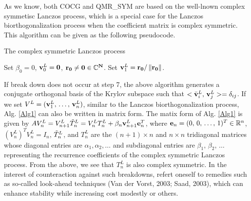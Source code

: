 \documentclass{article}
\begin{document}
As we know, both COCG and QMR\_SYM are based on the well-lnown complex symmetisc Lanczos process, which is a special case for the Lanczos biorthogonalization process when the coefficient matrix is complex symmetric. This algorithm can be given as the following pseudocode.
\begin{algorithm}
\caption{The complex symmetric Lanczos process}
\begin{algorithmic}[1]
\label{Alg1}
\State Set $\beta_0=0$, ${\bf{v}}^L_{0} = \bf{0}$, $\bf{r}_0 \neq \bf{0} \in \mathbb{C}^{N}$. 
\State Set ${\bf{v}}^{L}_{1} = \bf{r}_0 / \left\| \bf{r}_0 \right\|$.
\EndFor
\end{algorithmic}
\end{algorithm}
If break down does not occur at step 7, the above algorithm generates a conjugate orthogonal basis of the Krylov subspace such that $<{\bar{\bf{v}}}^L_{i}, \, {\bf{v}}^L_{j}> = \delta_{ij}$. If we set $V^L = ({\bf{v}}^L_1 , \, \dots ,\, {\bf{v}}^L_n)$, similar to the Lanczos biorthogonalization process, Alg. \ref{Alg1} can also be written in matrix form. The matix form of Alg. \ref{Alg1} is given by $A V^L_n = V^L_{n+1} \Tilde{T}^L_{n} = V^L_n T^L_n + \beta_n {\bf{v}}^L_{n+1}{\bf{e}}^T_n$, where ${\bf{e}}_n = (0, \, 0,\, \dots ,\, 1)^T \in \mathbb{R}^n$, $(V^L_n )^T V^L_n = I_n$, $\Tilde{T}^L_n$, and $T^L_n$ are the $(n+1) \times n$ and $n\times n$ tridiagonal matrices whose diagonal entries are $\alpha_1 , \alpha_2, \dots $ and subdiagonal entries are $\beta_1 ,\, \beta_2 , \, \dots$ representing the recurrence coefficients of the complex symmetric Lanczos process. From the above, we see that $T^L_n$ is also complex symmetric. In the interest of counteraction against such breakdowns, refert oneself to remedies such as so-called look-ahead techniques (Van der Vorst, 2003; Saad, 2003), which can enhance stability while increasing cost modestly or others.  
\end{document}
